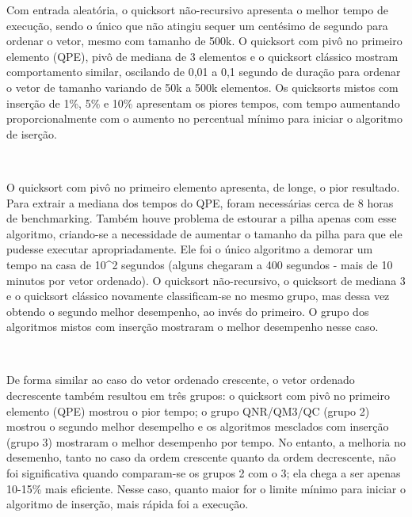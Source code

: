 \documentclass[11pt]{article}
\begin{document}
    Com entrada aleatória, o quicksort não-recursivo apresenta o melhor
tempo de execução, sendo o único que não atingiu sequer um centésimo de
segundo para ordenar o vetor, mesmo com tamanho de 500k. O quicksort com
pivô no primeiro elemento (QPE), pivô de mediana de 3 elementos e o
quicksort clássico mostram comportamento similar, oscilando de 0,01 a
0,1 segundo de duração para ordenar o vetor de tamanho variando de 50k a
500k elementos. Os quicksorts mistos com inserção de 1\%, 5\% e 10\%
apresentam os piores tempos, com tempo aumentando proporcionalmente com
o aumento no percentual mínimo para iniciar o algoritmo de iserção.

    \begin{center}
    \end{center}
    { \hspace*{\fill} \\}
    
    O quicksort com pivô no primeiro elemento apresenta, de longe, o pior
resultado. Para extrair a mediana dos tempos do QPE, foram necessárias
cerca de 8 horas de benchmarking. Também houve problema de estourar a
pilha apenas com esse algoritmo, criando-se a necessidade de aumentar o
tamanho da pilha para que ele pudesse executar apropriadamente. Ele foi
o único algoritmo a demorar um tempo na casa de 10\^{}2 segundos (alguns
chegaram a 400 segundos - mais de 10 minutos por vetor ordenado). O
quicksort não-recursivo, o quicksort de mediana 3 e o quicksort clássico
novamente classificam-se no mesmo grupo, mas dessa vez obtendo o segundo
melhor desempenho, ao invés do primeiro. O grupo dos algoritmos mistos
com inserção mostraram o melhor desempenho nesse caso.

    \begin{center}
    \end{center}
    { \hspace*{\fill} \\}
    
    De forma similar ao caso do vetor ordenado crescente, o vetor ordenado
decrescente também resultou em três grupos: o quicksort com pivô no
primeiro elemento (QPE) mostrou o pior tempo; o grupo QNR/QM3/QC (grupo
2) mostrou o segundo melhor desempelho e os algoritmos mesclados com
inserção (grupo 3) mostraram o melhor desempenho por tempo. No entanto,
a melhoria no desemenho, tanto no caso da ordem crescente quanto da
ordem decrescente, não foi significativa quando comparam-se os grupos 2
com o 3; ela chega a ser apenas 10-15\% mais eficiente. Nesse caso,
quanto maior for o limite mínimo para iniciar o algoritmo de inserção,
mais rápida foi a execução.
\end{document}
